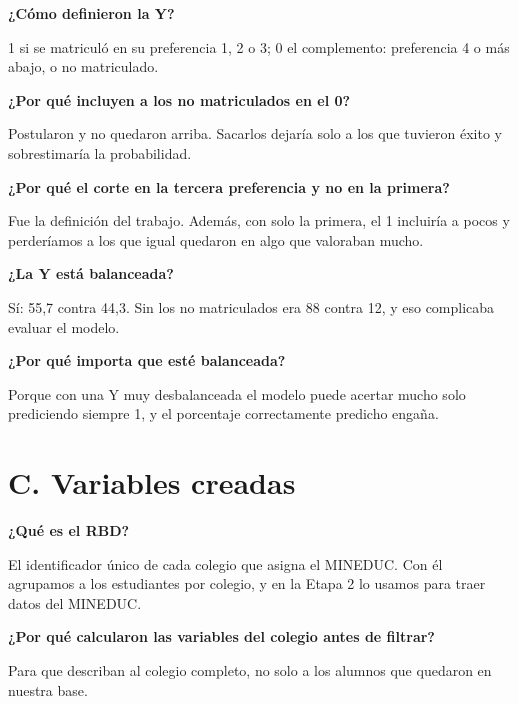\documentclass[11pt]{article}
\begin{document}
\textbf{¿Cómo definieron la Y?}\par
\begin{guion}1 si se matriculó en su preferencia 1, 2 o 3; 0 el complemento: preferencia 4 o más abajo, o no matriculado.\end{guion}

\textbf{¿Por qué incluyen a los no matriculados en el 0?}\par
\begin{guion}Postularon y no quedaron arriba. Sacarlos dejaría solo a los que tuvieron éxito y sobrestimaría la probabilidad.\end{guion}

\textbf{¿Por qué el corte en la tercera preferencia y no en la primera?}\par
\begin{guion}Fue la definición del trabajo. Además, con solo la primera, el 1 incluiría a pocos y perderíamos a los que igual quedaron en algo que valoraban mucho.\end{guion}

\textbf{¿La Y está balanceada?}\par
\begin{guion}Sí: 55,7 contra 44,3. Sin los no matriculados era 88 contra 12, y eso complicaba evaluar el modelo.\end{guion}

\textbf{¿Por qué importa que esté balanceada?}\par
\begin{guion}Porque con una Y muy desbalanceada el modelo puede acertar mucho solo prediciendo siempre 1, y el porcentaje correctamente predicho engaña.\end{guion}

\section*{C. Variables creadas}

\textbf{¿Qué es el RBD?}\par
\begin{guion}El identificador único de cada colegio que asigna el MINEDUC. Con él agrupamos a los estudiantes por colegio, y en la Etapa 2 lo usamos para traer datos del MINEDUC.\end{guion}

\textbf{¿Por qué calcularon las variables del colegio antes de filtrar?}\par
\begin{guion}Para que describan al colegio completo, no solo a los alumnos que quedaron en nuestra base.\end{guion}
\end{document}
